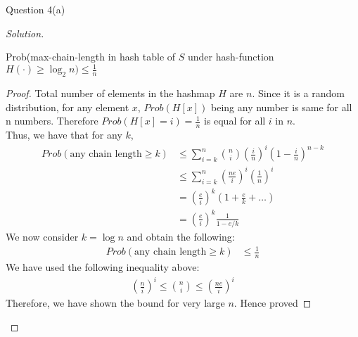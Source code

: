 \begin{solution}{Question 4(a)}\label{ques:41}
    \begin{question}
        
    \end{question}
    \tcblower{}
    \begin{proof}[Solution]
        \begin{claim}\label{claim:q1}
        Prob(max-chain-length in hash table of $S$ under hash-function $H(\cdot)\geq \log_2 n) \leq \frac{1}{n}$
        \end{claim}
        \begin{proof}
        Total number of elements in the hashmap $H$ are $n$. Since it is a random distribution, for any element $x$, $Prob(H[x])$ being any number is same for all n numbers. Therefore $Prob(H[x]=i)=\frac{1}{n}$ is equal for all $i$ in $n$.\\
        Thus, we have that for any $k$,
        \begin{equation}
            \begin{split}
                Prob(\text{any chain length} \geq k) &\leq\sum_{i=k}^n \binom{n}{i}\left(\frac{i}{n}\right)^i \left(1 - \frac{i}{n}\right)^{n-k}\\
                                                 &\leq\sum_{i=k}^n \left(\frac{ne}{i}\right)^i\left(\frac{1}{n}\right)^i\\
                                                 &= \left(\frac{e}{i}\right)^k\left(1 + \frac{e}{k} + \ldots \right)\\
                                                 &= \left(\frac{e}{i}\right)^k \frac{1}{1-e/k}
            \end{split}
        \end{equation}
        We now consider $k=\log{n}$ and obtain the following:
        \begin{equation}
            \begin{split}
                Prob(\text{any chain length} \geq k) &\leq \frac{1}{n}
            \end{split}
        \end{equation}
        We have used the following inequality above:
        \begin{equation}
            \begin{split}
                \left( \frac{n}{i} \right)^i \leq \binom n i \leq \left( \frac{ne}{i} \right)^i            \end{split}
        \end{equation}
        Therefore, we have shown the bound for very large $n$. Hence proved
        \end{proof}
        
        
        
        
        
    \end{proof}
\end{solution}
